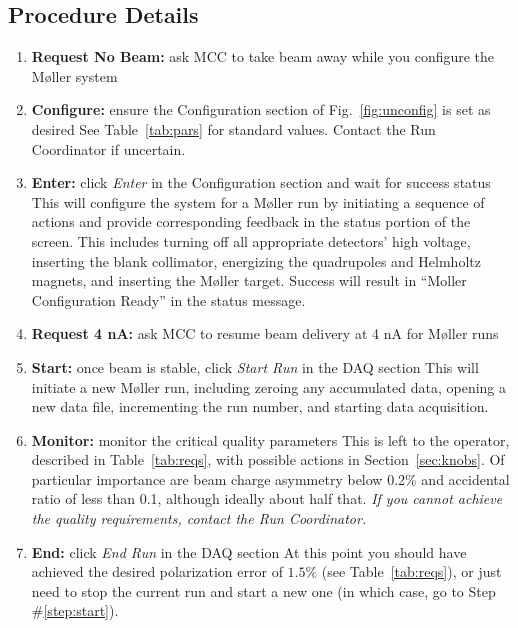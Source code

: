 \documentclass[amsmath,amssymb,notitlepage,12pt]{revtex4}
\begin{document}
\subsection{Procedure Details}
\begin{enumerate}
    \item {\bf Request No Beam:}  ask MCC to take beam away while you configure the M{\o}ller system
    \item {\bf Configure:}  ensure the Configuration section of Fig.~\ref{fig:unconfig} is set as desired
        \subitem
        See Table~\ref{tab:pars} for standard values.  Contact the Run Coordinator if uncertain.
\item {\bf Enter:} click {\em Enter} in the Configuration section and wait for success status
    \subitem This will configure the system for a M{\o}ller run by initiating a sequence of actions and provide corresponding feedback in the status portion of the screen.  This includes turning off all appropriate detectors' high voltage, inserting the blank collimator, energizing the quadrupoles and Helmholtz magnets, and inserting the M{\o}ller target.  Success will result in ``Moller Configuration Ready'' in the status message.
\item {\bf Request 4 nA:} \label{step:beam} ask MCC to resume beam delivery at 4 nA for M{\o}ller runs
\item {\bf Start:} \label{step:start} once beam is stable, click {\em Start Run} in the DAQ section
    \subitem This will initiate a new M{\o}ller run, including zeroing any accumulated data, opening a new data file, incrementing the run number, and starting data acquisition.
\item {\bf Monitor:} monitor the critical quality parameters
    \subitem This is left to the operator, described in Table~\ref{tab:reqs}, with possible actions in Section~\ref{sec:knobs}.  Of particular importance are beam charge asymmetry below 0.2\% and accidental ratio of less than 0.1, although ideally about half that.  {\em If you cannot achieve the quality requirements, contact the Run Coordinator.}
\item {\bf End:} click {\em End Run} in the DAQ section
    \subitem At this point you should have achieved the desired polarization error of $1.5\%$ (see Table~\ref{tab:reqs}), or just need to stop the current run and start a new one (in which case, go to Step \#\ref{step:start}).

\end{enumerate}
\end{document}
